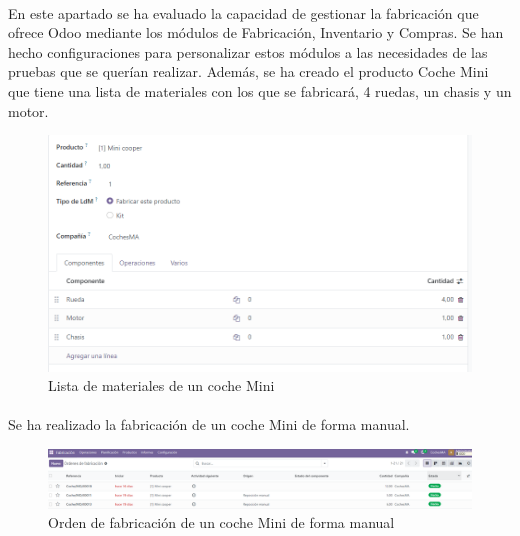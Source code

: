 \paragraph{}
En este apartado se ha evaluado la capacidad de gestionar la fabricación que ofrece Odoo mediante los módulos de Fabricación, Inventario y Compras. Se han hecho configuraciones para personalizar estos módulos a las necesidades de las pruebas que se querían realizar. Además, se ha creado el producto Coche Mini que tiene una lista de materiales con los que se fabricará, 4 ruedas, un chasis y un motor.
\begin{figure}[h]
    \centering
    \includegraphics[width=1\linewidth]{fotosGestFab/coche.png}
    \caption{Lista de materiales de un coche Mini}
    \label{fig:enter-label}
\end{figure}
\paragraph{}
Se ha realizado la fabricación de un coche Mini de forma manual.
\begin{figure}[h]
    \centering
    \includegraphics[width=1\linewidth]{fotosGestFab/manual.png}
    \caption{Orden de fabricación de un coche Mini de forma manual}
    \label{fig:enter-label}
\end{figure}
